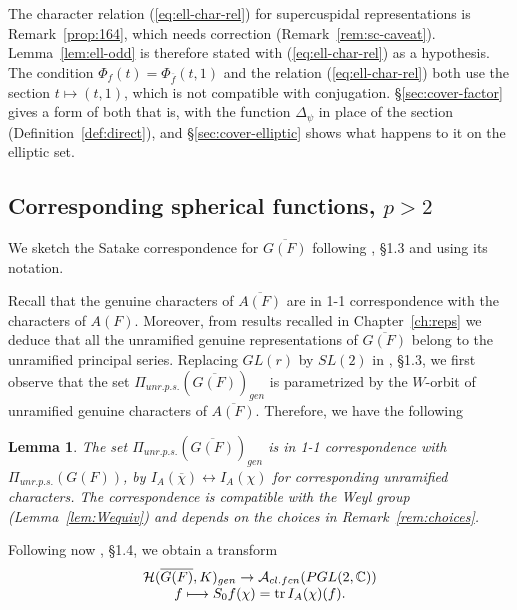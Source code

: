 \documentclass[12pt,letterpaper,openany]{book}
\theoremstyle{plain}
\newtheorem{lemma}[theorem]{Lemma}
\theoremstyle{definition}
\theoremstyle{remark}
\theoremstyle{remark}
\newcommand{\tr}{\operatorname{tr}}
\begin{document}
The character relation (\ref{eq:ell-char-rel}) for supercuspidal
representations is Remark~\ref{prop:164}, which needs correction
(Remark~\ref{rem:sc-caveat}). Lemma~\ref{lem:ell-odd} is therefore
stated with (\ref{eq:ell-char-rel}) as a hypothesis. The condition
$\Phi_f(t)=\Phi_{\overline f}(t,1)$ and the relation
(\ref{eq:ell-char-rel}) both use the section $t\mapsto(t,1)$, which is
not compatible with conjugation. \S\ref{sec:cover-factor} gives a form of
both that is, with the function $\Delta_\psi$ in place of the section
(Definition~\ref{def:direct}), and \S\ref{sec:cover-elliptic} shows what
happens to it on the elliptic set.

\subsection{Corresponding spherical functions, \texorpdfstring{$p> 2$}{p> 2}}\label{sec:spherical}

We sketch the Satake correspondence for $\overline{G(F)}$
following \cite{J}, \S 1.3 and using its notation.

Recall that the genuine characters of
$\overline{A(F)}$ are in 1-1 correspondence with
the characters of $A(F)$. Moreover, from results recalled in
Chapter~\ref{ch:reps} we deduce that all
the unramified genuine representations of
$\overline{G(F)}$ belong to the unramified principal series.
Replacing $GL(r)$ by
$SL(2)$ in \cite{J}, \S 1.3, we first observe that the
set $\Pi_{unr.p.s.}(\overline{G(F)})_{gen}$ is
parametrized by the $W$-orbit of unramified
genuine characters of $\overline{A(F)}$. Therefore, we have the following

\begin{lemma} The set $\Pi_{unr.p.s.}(\overline{G(F)})_{gen}$ is
in 1-1 correspondence with
$\Pi_{unr.p.s.}(G(F))$, by $I_A(\overline\chi)\leftrightarrow I_A(\chi)$
for corresponding unramified characters. The correspondence is compatible
with the Weyl group (Lemma~\ref{lem:Wequiv}) and depends on the choices in
Remark~\ref{rem:choices}.
\end{lemma}

Following now \cite{J}, \S 1.4, we obtain a transform
\begin{equation}
\begin{array}{c}
{\cal{H}}(\overline{G(F)},K)_{gen}\rightarrow
{\cal{A}}_{cl.fcn}(PGL(2,{\mathbb{C}}))\\
f\longmapsto S_0 f(\chi)=\tr I_A(\chi)(f).
\end{array}
\end{equation}
\end{document}
